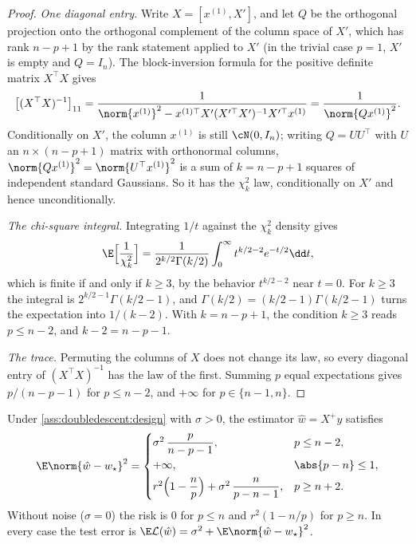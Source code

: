 \begin{refsection}
\begin{proof}
\emph{One diagonal entry.} Write $X=[x^{(1)},X']$, and let $Q$ be the orthogonal projection onto the orthogonal complement of the column space of $X'$, which has rank $n-p+1$ by the rank statement applied to $X'$ (in the trivial case $p=1$, $X'$ is empty and $Q=I_n$). The block-inversion formula for the positive definite matrix $X^\top X$ gives
\[
  \bigl[(X^\top X)^{-1}\bigr]_{11}=\frac1{\norm{x^{(1)}}^2-x^{(1)\top}X'(X'^\top X')^{-1}X'^\top x^{(1)}}=\frac1{\norm{Qx^{(1)}}^2}.
\]
Conditionally on $X'$, the column $x^{(1)}$ is still $\cN(0,I_n)$; writing $Q=UU^\top$ with $U$ an $n\times(n-p+1)$ matrix with orthonormal columns, $\norm{Qx^{(1)}}^2=\norm{U^\top x^{(1)}}^2$ is a sum of $k=n-p+1$ squares of independent standard Gaussians. So it has the $\chi^2_k$ law, conditionally on $X'$ and hence unconditionally.

\emph{The chi-square integral.} Integrating $1/t$ against the $\chi^2_k$ density gives
\[
  \E\Bigl[\frac1{\chi^2_k}\Bigr]=\frac1{2^{k/2}\Gamma(k/2)}\int_0^\infty t^{k/2-2}e^{-t/2}\dd t ,
\]
which is finite if and only if $k\ge3$, by the behavior $t^{k/2-2}$ near $t=0$. For $k\ge3$ the integral is $2^{k/2-1}\Gamma(k/2-1)$, and $\Gamma(k/2)=(k/2-1)\Gamma(k/2-1)$ turns the expectation into $1/(k-2)$. With $k=n-p+1$, the condition $k\ge3$ reads $p\le n-2$, and $k-2=n-p-1$.

\emph{The trace.} Permuting the columns of $X$ does not change its law, so every diagonal entry of $(X^\top X)^{-1}$ has the law of the first. Summing $p$ equal expectations gives $p/(n-p-1)$ for $p\le n-2$, and $+\infty$ for $p\in\{n-1,n\}$.
\end{proof}

\begin{theorem}\label{thm:doubledescent:exact}
Under \cref{ass:doubledescent:design} with $\sigma>0$, the estimator $\hat w=X^+y$ satisfies
\begin{equation}\label{eq:doubledescent:exact}
  \E\norm{\hat w-w_\star}^2=\begin{cases}
  \sigma^2\,\dfrac{p}{n-p-1}, & p\le n-2,\\[1.4ex]
  +\infty, & \abs{p-n}\le1,\\[0.8ex]
  r^2\Bigl(1-\dfrac np\Bigr)+\sigma^2\,\dfrac{n}{p-n-1}, & p\ge n+2.
  \end{cases}
\end{equation}
Without noise ($\sigma=0$) the risk is $0$ for $p\le n$ and $r^2(1-n/p)$ for $p\ge n$. In every case the test error is $\E\Loss(\hat w)=\sigma^2+\E\norm{\hat w-w_\star}^2$.
\end{theorem}


\end{refsection}
